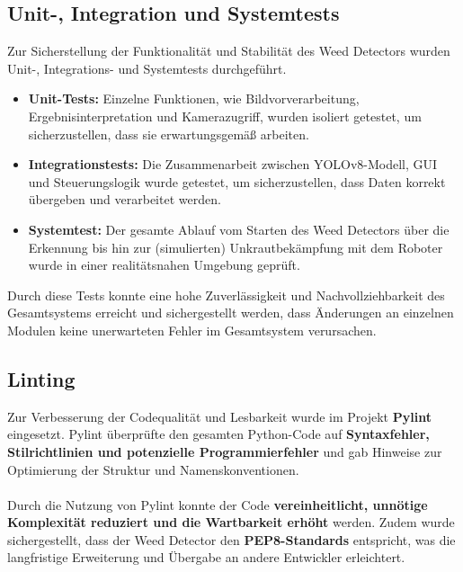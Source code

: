 \documentclass[12pt]{scrartcl}
\begin{document}
\subsection{Unit-, Integration und Systemtests}
Zur Sicherstellung der Funktionalität und Stabilität des Weed Detectors wurden Unit-, Integrations- und Systemtests durchgeführt.
\begin{itemize}
    \item \textbf{Unit-Tests:} Einzelne Funktionen, wie Bildvorverarbeitung, Ergebnisinterpretation und Kamerazugriff, wurden isoliert getestet, um sicherzustellen, dass sie erwartungsgemäß arbeiten.
    \item \textbf{Integrationstests:} Die Zusammenarbeit zwischen YOLOv8-Modell, GUI und Steuerungslogik wurde getestet, um sicherzustellen, dass Daten korrekt übergeben und verarbeitet werden.
    \item \textbf{Systemtest:} Der gesamte Ablauf vom Starten des Weed Detectors über die Erkennung bis hin zur (simulierten) Unkrautbekämpfung mit dem Roboter wurde in einer realitätsnahen Umgebung geprüft.
\end{itemize}
Durch diese Tests konnte eine hohe Zuverlässigkeit und Nachvollziehbarkeit des Gesamtsystems erreicht und sichergestellt werden, dass Änderungen an einzelnen Modulen keine unerwarteten Fehler im Gesamtsystem verursachen.

\newpage

\subsection{Linting}
Zur Verbesserung der Codequalität und Lesbarkeit wurde im Projekt \textbf{Pylint} eingesetzt. Pylint überprüfte den gesamten Python-Code auf \textbf{Syntaxfehler, Stilrichtlinien und potenzielle Programmierfehler} und gab Hinweise zur Optimierung der Struktur und Namenskonventionen.\\
\\
Durch die Nutzung von Pylint konnte der Code \textbf{vereinheitlicht, unnötige Komplexität reduziert und die Wartbarkeit erhöht} werden. Zudem wurde sichergestellt, dass der Weed Detector den \textbf{PEP8-Standards} entspricht, was die langfristige Erweiterung und Übergabe an andere Entwickler erleichtert.
\end{document}
